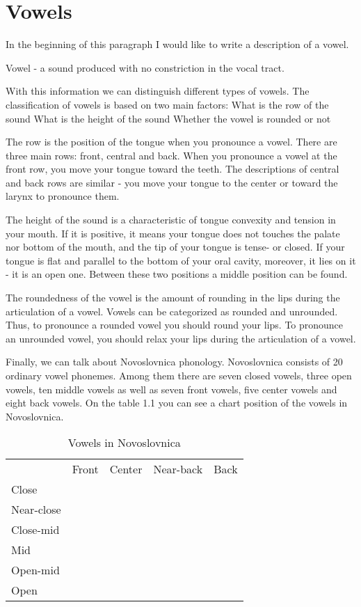 \section{Vowels}

In the beginning of this paragraph I would like to write a description of a vowel.

Vowel - a sound produced with no constriction in the vocal tract.

With this information we can distinguish different types of vowels. The classification of vowels is based on two main factors:
What is the row of the sound
What is the height of the sound
Whether the vowel is rounded or not

The row is the position of the tongue when you pronounce a vowel. There are three main rows: front, central and back. When you pronounce a vowel at the front row, you move your tongue toward the teeth. The descriptions of central and back rows are similar - you move your tongue to the center or toward the larynx to pronounce them.

The height of the sound is a characteristic of tongue convexity and tension in your mouth. If it is positive, it means your tongue does not touches the palate nor bottom of the mouth, and the tip of your tongue is tense- or closed. If your tongue is flat and parallel to the bottom of your oral cavity, moreover, it lies on it - it is an open one. Between these two positions a middle position can be found.

The roundedness of the vowel is the amount of rounding in the lips during the articulation of a vowel. Vowels can be categorized as rounded and unrounded. Thus, to pronounce a rounded vowel you should round your lips. To pronounce an unrounded vowel, you should relax your lips during the articulation of a vowel.

Finally, we can talk about Novoslovnica phonology. Novoslovnica consists of 20 ordinary vowel phonemes. Among them there are seven closed vowels, three open vowels, ten middle vowels as well as seven front vowels, five center vowels and eight back vowels. On the table 1.1 you can see a chart position of the vowels in Novoslovnica.

\begin{table}[]
\caption{Vowels in Novoslovnica}
	\begin{tabular}{lllll}
		& Front & Center & Near-back & Back \\
		Close      &       &        &           &      \\
		Near-close &       &        &           &      \\
		Close-mid  &       &        &           &      \\
		Mid        &       &        &           &      \\
		Open-mid   &       &        &           &      \\
		Open       &       &        &           &     
	\end{tabular}
\end{table}

